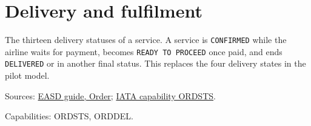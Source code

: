 
\section{Delivery and fulfilment}

\begin{definition}
  \label{def:c08-delivery-status}
  The thirteen delivery statuses of a service.  A service is
  \texttt{CONFIRMED} while the airline waits for payment, becomes
  \texttt{READY TO PROCEED} once paid, and ends \texttt{DELIVERED} or in
  another final status.  This replaces the four delivery states in the pilot
  model.

  Sources: \href{https://standards.atlassian.net/wiki/spaces/EASD/pages/574849062/Order}{EASD guide, Order};
  \href{https://retailing.iata.org/armi/docs/ORDSTS/}{IATA capability ORDSTS}.

  Capabilities: ORDSTS, ORDDEL.
\end{definition}

